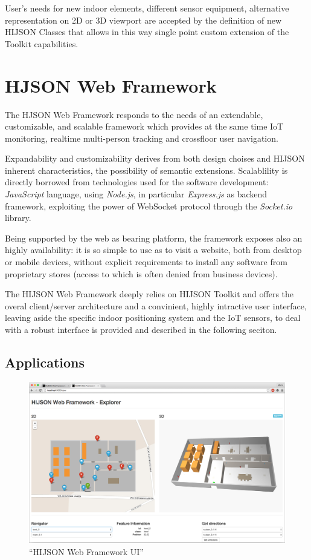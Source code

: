 \documentclass{sig-alternate}
\begin{document}
User's needs for new indoor elements, different sensor equipment,
alternative representation on 2D or 3D viewport are accepted by the
definition of new HIJSON Classes that allows in this way single point
custom extension of the Toolkit capabilities.

\section{HJSON Web Framework}\label{hjson-web-framework}

The HJSON Web Framework responds to the needs of an extendable,
customizable, and scalable framework which provides at the same time IoT
monitoring, realtime multi-person tracking and crossfloor user
navigation.

Expandability and customizability derives from both design choises and
HIJSON inherent characteristics, the possibility of semantic extensions.
Scalablility is directly borrowed from technologies used for the
software development: \emph{JavaScript} language, using \emph{Node.js},
in particular \emph{Express.js} as backend framework, exploiting the
power of WebSocket protocol through the \emph{Socket.io} library.

Being supported by the web as bearing platform, the framework exposes
also an highly availability: it is so simple to use as to visit a
website, both from desktop or mobile devices, without explicit
requirements to install any software from proprietary stores (access to
which is often denied from business devices).

The HIJSON Web Framework deeply relies on HIJSON Toolkit and offers the
overal client/server architecture and a convinient, highly intractive
user interface, leaving aside the specific indoor positioning system and
the IoT sensors, to deal with a robust interface is provided and
described in the following seciton.

\subsection{Applications}\label{applications}

\begin{figure}[ht]
\centering
\includegraphics[width=\textwidth]{images/web-framework.png}
\caption{``HIJSON Web Framework UI''}
\label{fig:web-framework-ui}
\end{figure}
\end{document}
